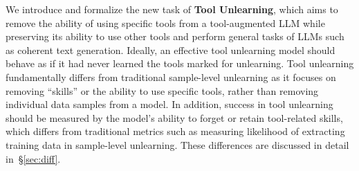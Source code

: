 We introduce and formalize the new task of \textbf{Tool Unlearning}, which aims to remove the ability of using specific tools from a tool-augmented LLM while preserving its ability to use other tools and perform general tasks of LLMs such as coherent text generation. 
Ideally, an effective tool unlearning model should behave as if it had never learned the tools marked for unlearning. 
Tool unlearning fundamentally differs from traditional sample-level unlearning as it focuses on removing ``skills'' or the ability to use specific tools, rather than removing individual data samples from a model. In addition, success in tool unlearning should be measured by the model’s ability to forget or retain tool-related skills, which differs from traditional metrics such as measuring likelihood of extracting training data in sample-level unlearning.
These differences are discussed in detail in~\S\ref{sec:diff}.


